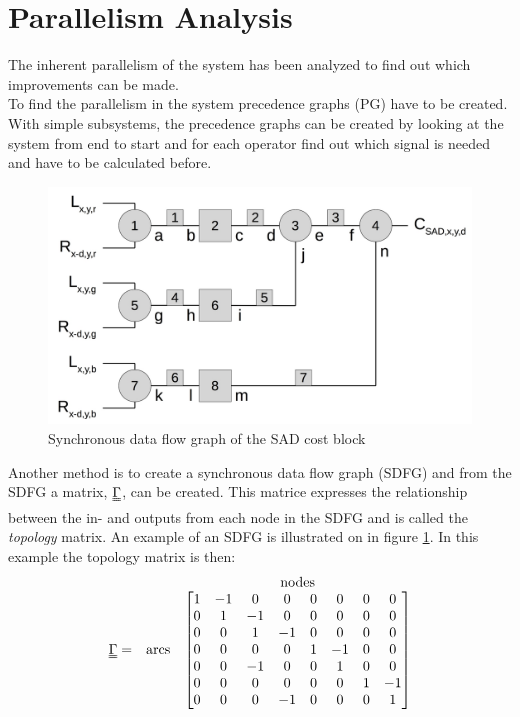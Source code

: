 \section{Parallelism Analysis}\label{sec:paraanal}
The inherent parallelism of the system has been analyzed to find out which improvements can be made.\\

To find the parallelism in the system precedence graphs (PG) have to be created. With simple subsystems, the precedence graphs can be created  by looking at the system from end to start and for each operator find out which signal is needed and have to be calculated before.\\ 

\begin{figure}[ht!]
  \centering
  \includegraphics[scale=0.25]{figures/c_sad_sdfg.jpg}
  \caption{Synchronous data flow graph of the SAD cost block}
  \label{fig:c_sad_sdfg}
\end{figure}
Another method is to create a synchronous data flow graph (SDFG) and from the SDFG a matrix, $\uuline\Gamma$, can be created. This matrice expresses the relationship between the in- and outputs from each node in the SDFG and is called the \textit{topology} matrix. An example of an SDFG is illustrated on in figure \ref{fig:c_sad_sdfg}. In this example the topology matrix is then:
\begin{equation}
  \begin{array}{ c c c }
    & & \text{nodes} \\
  \uuline\Gamma = & \text{arcs} & 
  \begin{bmatrix}
   1 & -1 & 0 & 0 & 0 & 0 & 0 & 0 \\
   0 & 1 & -1 & 0 & 0 & 0 & 0 & 0 \\
   0 & 0 & 1 & -1 & 0 & 0 & 0 & 0 \\
   0 & 0 & 0 & 0 & 1 & -1 & 0 & 0 \\
   0 & 0 & -1 & 0 & 0 & 1 & 0 & 0 \\
   0 & 0 & 0 & 0 & 0 & 0 & 1 & -1 \\
   0 & 0 & 0 & -1& 0 & 0 & 0 & 1 \\
  \end{bmatrix}
  \end{array}
\end{equation}
